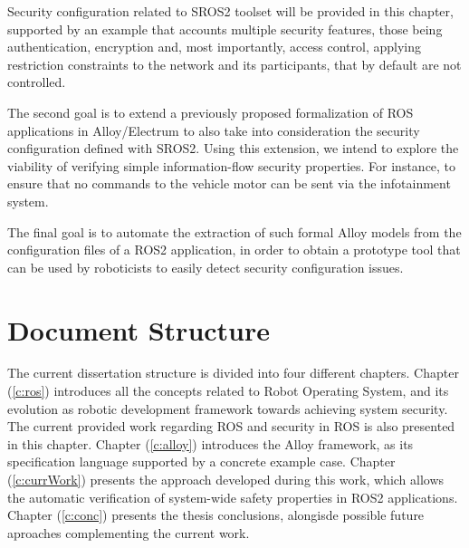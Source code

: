 Security configuration related to SROS2 toolset will be provided in this chapter, supported by an example that accounts multiple security features, those being authentication, encryption and, most importantly, access control, applying restriction constraints to the network and its participants, that by default are not controlled.

The second goal is to extend a previously proposed \cite{9341085} formalization of ROS applications in Alloy/Electrum \cite{alloy-6, lwspecification} to also take into consideration the security configuration defined with SROS2. Using this extension, we intend to explore the viability of verifying simple information-flow security properties. For instance, to ensure that no commands to the vehicle motor can be sent via the infotainment system.

The final goal is to automate the extraction of such formal Alloy models from the configuration files of a ROS2 application, in order to obtain a prototype tool that can be used by roboticists to easily detect security configuration issues.

\section{Document Structure}

The current dissertation structure is divided into four different chapters. Chapter (\ref{c:ros}) introduces all the concepts related to Robot Operating System, and its evolution as robotic development framework towards achieving system security. The current provided work regarding ROS and security in ROS is also presented in this chapter. Chapter (\ref{c:alloy}) introduces the Alloy framework, as its specification language supported by a concrete example case. Chapter (\ref{c:currWork}) presents the approach developed during this work, which allows
the automatic verification of system-wide safety properties in ROS2 applications. Chapter (\ref{c:conc}) presents the thesis conclusions, alongisde possible future aproaches complementing the current work.
